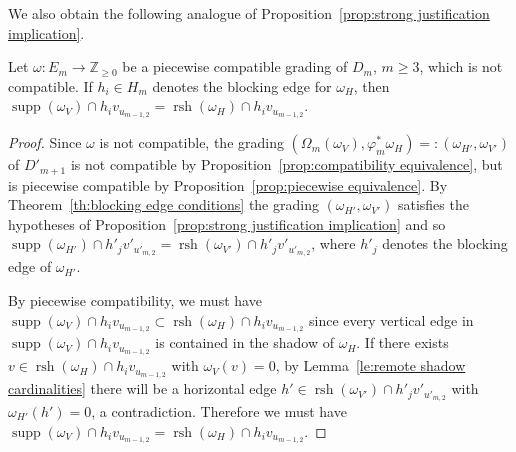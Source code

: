 \documentclass[ALCO,ThmDefs,Unicode,epreuves]{cedram}
\newcommand{\ZZ}{\mathbb{Z}}
\DeclareMathOperator{\supp}{supp}
\DeclareMathOperator{\rsh}{rsh}
\begin{document}
We also obtain the following analogue of Proposition~\ref{prop:strong justification implication}.
\begin{corollary}
 \label{cor:support and remote shadow}
 Let $\omega:E_m\to\ZZ_{\ge0}$ be a piecewise compatible grading of $D_m$, $m\ge3$, which is not compatible.
 If $h_i\in H_m$ denotes the blocking edge for $\omega_H$, then $\supp(\omega_V)\cap h_iv_{u_{m-1,2}}=\rsh(\omega_H)\cap h_iv_{u_{m-1,2}}$.
\end{corollary}
\begin{proof}
 Since $\omega$ is not compatible, the grading $(\Omega_m(\omega_V),\varphi^*_m\omega_H)=:(\omega_{H'},\omega_{V'})$ of $D'_{m+1}$ is not compatible by Proposition~\ref{prop:compatibility equivalence}, but is piecewise compatible by Proposition~\ref{prop:piecewise equivalence}.
 By Theorem~\ref{th:blocking edge conditions} the grading $(\omega_{H'},\omega_{V'})$ satisfies the hypotheses of Proposition~\ref{prop:strong justification implication} and so $\supp(\omega_{H'})\cap h'_jv'_{u'_{m,2}}=\rsh(\omega_{V'})\cap h'_jv'_{u'_{m,2}}$, where $h'_j$ denotes the blocking edge of $\omega_{H'}$.

 By piecewise compatibility, we must have $\supp(\omega_V)\cap h_iv_{u_{m-1,2}}\subset\rsh(\omega_H)\cap h_iv_{u_{m-1,2}}$ since every vertical edge in $\supp(\omega_V)\cap h_iv_{u_{m-1,2}}$ is contained in the shadow of $\omega_H$.
 If there exists $v\in\rsh(\omega_H)\cap h_iv_{u_{m-1,2}}$ with $\omega_V(v)=0$, by Lemma~\ref{le:remote shadow cardinalities} there will be a horizontal edge $h'\in\rsh(\omega_{V'})\cap h'_jv'_{u'_{m,2}}$ with $\omega_{H'}(h')=0$, a contradiction.
 Therefore we must have $\supp(\omega_V)\cap h_iv_{u_{m-1,2}}=\rsh(\omega_H)\cap h_iv_{u_{m-1,2}}$.
\end{proof}
\end{document}

